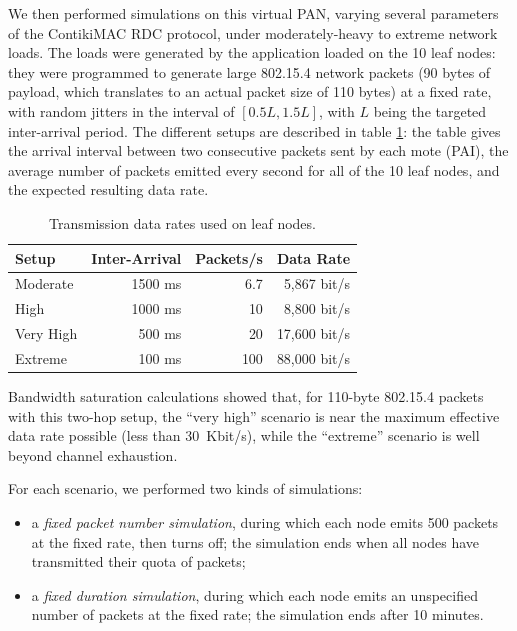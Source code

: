 \documentclass[conference]{IEEEtran}
\begin{document}
We then performed simulations on this virtual PAN, varying several parameters
of the ContikiMAC RDC protocol, under moderately-heavy to extreme network
loads. The loads were generated by the application loaded on the 10 leaf
nodes: they were programmed to generate large 802.15.4 network packets
(90 bytes of payload, which translates to an actual packet size of
110 bytes) at a fixed rate, with random jitters in the interval of
$[ 0.5 L , 1.5  L ]$, with $L$ being the targeted inter-arrival
period. The different setups are described in table \ref{TblDataRates}:
the table gives the arrival interval between two consecutive packets sent
by each mote (PAI), the average number of packets emitted every second
for all of the 10 leaf nodes, and the expected resulting data rate.

\begin{table}[htb]
\centering
\begin{tabular}{|l|r|r|r|}
\hline
Setup     & Inter-Arrival & Packets/s & Data Rate \\
\hline
Moderate  &    1500 ms    &    6.7    &  5,867 bit/s \\ 
High      &    1000 ms    &   10      &  8,800 bit/s \\
Very High &     500 ms    &   20      & 17,600 bit/s \\
Extreme   &     100 ms    &  100      & 88,000 bit/s \\
\hline
\end{tabular}
\caption{Transmission data rates used on leaf nodes.}
\label{TblDataRates}
\end{table}

Bandwidth saturation calculations showed that, for 110-byte 802.15.4 packets
with this two-hop setup, the ``very high'' scenario is near the maximum
effective data rate possible (less than 30~Kbit/s), while the ``extreme''
scenario is well beyond channel exhaustion.

For each scenario, we performed two kinds of simulations:
\begin{itemize}
\item a \emph{fixed packet number simulation}, during which each node emits
500 packets at the fixed rate, then turns off; the simulation ends when all
nodes have transmitted their quota of packets;

\item a \emph{fixed duration simulation}, during which each node emits an
unspecified number of packets at the fixed rate; the simulation ends after
10 minutes.
\end{itemize}
\end{document}
